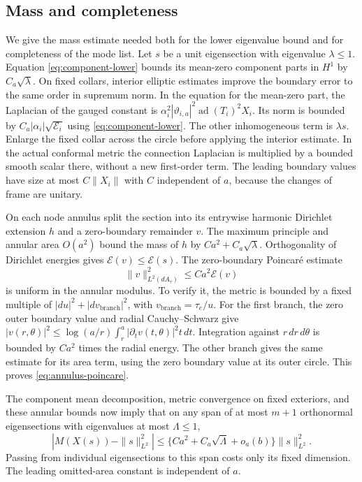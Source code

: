 \subsection{Mass and completeness}
We give the mass estimate needed both for the lower eigenvalue
bound and for completeness of the mode list. Let $s$ be a unit
eigensection with eigenvalue $\lambda\le1$. Equation
\eqref{eq:component-lower} bounds its mean-zero component
parts in $H^1$ by $C_a\sqrt\lambda$. On fixed collars,
interior elliptic estimates improve the boundary error to
the same order in supremum norm. In the equation for the
mean-zero part, the Laplacian of the gauged constant is
$\alpha_i^2|\vartheta_{i,a}|^2\operatorname{ad}(T_i)^2X_i$.
Its norm is bounded by $C_a|\alpha_i|\sqrt{\mathcal E_i}$
using \eqref{eq:component-lower}. The other inhomogeneous
term is $\lambda s$. Enlarge the fixed collar across the
circle before applying the interior estimate. In the
actual conformal metric the connection Laplacian is
multiplied by a bounded smooth scalar there, without a new
first-order term. The leading boundary values have size
at most $C\|X_i\|$ with $C$ independent of $a$, because
the changes of frame are unitary.

On each node annulus split the section into its entrywise
harmonic Dirichlet extension $h$ and a zero-boundary remainder
$v$. The maximum principle and annular area $O(a^2)$ bound
the mass of $h$ by $Ca^2+C_a\sqrt\lambda$. Orthogonality
of Dirichlet energies gives
$\mathcal E(v)\le\mathcal E(s)$. The zero-boundary Poincar\'e
estimate
\begin{equation}\label{eq:annulus-poincare}
 \|v\|_{L^2(dA_\tau)}^2\le Ca^2\mathcal E(v)
\end{equation}
is uniform in the annular modulus. To verify it, the
metric is bounded by a fixed multiple of
$|du|^2+|dv_{\mathrm{branch}}|^2$, with
$v_{\mathrm{branch}}=\tau_e/u$. For the first branch,
the zero outer boundary value and radial Cauchy--Schwarz
give
$|v(r,\theta)|^2\le\log(a/r)\int_r^a
|\partial_tv(t,\theta)|^2t\,dt$.
Integration against $r\,dr\,d\theta$ is bounded by
$Ca^2$ times the radial energy. The other branch gives
the same estimate for its area term, using the zero
boundary value at its outer circle. This proves
\eqref{eq:annulus-poincare}.

The component mean decomposition, metric convergence on
fixed exteriors, and these annular bounds now imply that
on any span of at most $m+1$ orthonormal eigensections
with eigenvalues at most $\Lambda\le1$,
\begin{equation}\label{eq:weak-mass}
 |M(X(s))-\|s\|_{L^2}^2|
 \le\{Ca^2+C_a\sqrt\Lambda+o_a(b)\}\|s\|_{L^2}^2.
\end{equation}
Passing from individual eigensections to this span costs
only its fixed dimension. The leading omitted-area
constant is independent of $a$.

